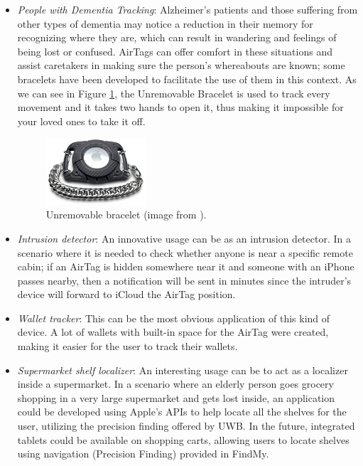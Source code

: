 \documentclass[english]{article}
\begin{document}
\begin{itemize}
  \item \textit{People with Dementia Tracking}: Alzheimer's patients and those suffering from other types of dementia may notice a reduction in their memory for recognizing where they are, which can result in wandering and feelings of being lost or confused. AirTags can offer comfort in these situations and assist caretakers in making sure the person's whereabouts are known; some bracelets have been developed to facilitate the use of them in this context. As we can see in Figure \ref{img:brac}, the Unremovable Bracelet is used to track every movement and it takes two hands to open it, thus making it impossible for your loved ones to take it off.
  \begin{figure}[]
    \centering
    \includegraphics[width=0.35\textwidth]{images/AirT-Blk-Sm.jpg}
    \caption{Unremovable bracelet (image from \cite{bracelets}).}
    \label{img:brac}
  \end{figure}
  \item \textit{Intrusion detector}: An innovative usage can be as an intrusion detector. In a scenario where it is needed to check whether anyone is near a specific remote cabin; if an AirTag is hidden somewhere near it and someone with an iPhone passes nearby, then a notification will be sent in minutes since the intruder's device will forward to iCloud the AirTag position.
  \item \textit{Wallet tracker}: This can be the most obvious application of this kind of device. A lot of wallets with built-in space for the AirTag were created, making it easier for the user to track their wallets.
  \item \textit{Supermarket shelf localizer}: An interesting usage can be to act as a localizer inside a supermarket. In a scenario where an elderly person goes grocery shopping in a very large supermarket and gets lost inside, an application could be developed using Apple's APIs to help locate all the shelves for the user, utilizing the precision finding offered by UWB. In the future, integrated tablets could be available on shopping carts, allowing users to locate shelves using navigation (Precision Finding) provided in FindMy.
\end{itemize}
\end{document}
